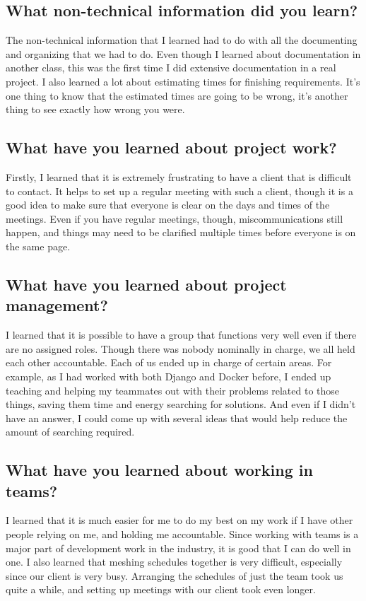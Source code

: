\documentclass[draftclsnofoot,10pt,onecolumn]{IEEEtran} %
\begin{document}
\subsection{What non-technical information did you learn?}
The non-technical information that I learned had to do with all the documenting
and organizing that we had to do. Even though I learned about documentation in
another class, this was the first time I did extensive documentation in a real
project. I also learned a lot about estimating times for finishing requirements.
It's one thing to know that the estimated times are going to be wrong, it's
another thing to see exactly how wrong you were.

\subsection{What have you learned about project work?}
Firstly, I learned that it is extremely frustrating to have a client that is
difficult to contact. It helps to set up a regular meeting with such a client,
though it is a good idea to make sure that everyone is clear on the days and
times of the meetings. Even if you have regular meetings, though,
miscommunications still happen, and things may need to be clarified multiple
times before everyone is on the same page.

\subsection{What have you learned about project management?}
I learned that it is possible to have a group that functions very well even if
there are no assigned roles. Though there was nobody nominally in charge, we all
held each other accountable. Each of us ended up in charge of certain areas. For
example, as I had worked with both Django and Docker before, I ended up teaching
and helping my teammates out with their problems related to those things, saving
them time and energy searching for solutions. And even if I didn't have an
answer, I could come up with several ideas that would help reduce the amount of
searching required.

\subsection{What have you learned about working in teams?}
I learned that it is much easier for me to do my best on my work if I have other
people relying on me, and holding me accountable. Since working with teams is a
major part of development work in the industry, it is good that I can do well in
one. I also learned that meshing schedules together is very difficult,
especially since our client is very busy. Arranging the schedules of just the
team took us quite a while, and setting up meetings with our client took even
longer.
\end{document}
